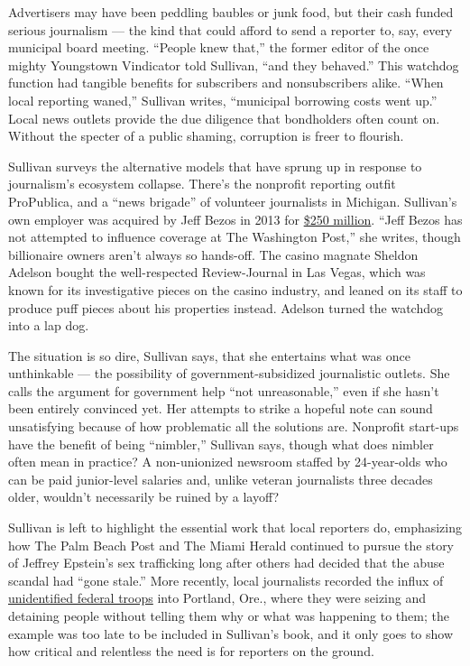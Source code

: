 Advertisers may have been peddling baubles or junk food, but their cash
funded serious journalism --- the kind that could afford to send a
reporter to, say, every municipal board meeting. ``People knew that,''
the former editor of the once mighty Youngstown Vindicator told
Sullivan, ``and they behaved.'' This watchdog function had tangible
benefits for subscribers and nonsubscribers alike. ``When local
reporting waned,'' Sullivan writes, ``municipal borrowing costs went
up.'' Local news outlets provide the due diligence that bondholders
often count on. Without the specter of a public shaming, corruption is
freer to flourish.

Sullivan surveys the alternative models that have sprung up in response
to journalism's ecosystem collapse. There's the nonprofit reporting
outfit ProPublica, and a ``news brigade'' of volunteer journalists in
Michigan. Sullivan's own employer was acquired by Jeff Bezos in 2013 for
\href{https://www.nytimes3xbfgragh.onion/2019/02/11/business/media/washington-post-jeff-bezos.html}{\$250
million}. ``Jeff Bezos has not attempted to influence coverage at The
Washington Post,'' she writes, though billionaire owners aren't always
so hands-off. The casino magnate Sheldon Adelson bought the
well-respected Review-Journal in Las Vegas, which was known for its
investigative pieces on the casino industry, and leaned on its staff to
produce puff pieces about his properties instead. Adelson turned the
watchdog into a lap dog.

The situation is so dire, Sullivan says, that she entertains what was
once unthinkable --- the possibility of government-subsidized
journalistic outlets. She calls the argument for government help ``not
unreasonable,'' even if she hasn't been entirely convinced yet. Her
attempts to strike a hopeful note can sound unsatisfying because of how
problematic all the solutions are. Nonprofit start-ups have the benefit
of being ``nimbler,'' Sullivan says, though what does nimbler often mean
in practice? A non-unionized newsroom staffed by 24-year-olds who can be
paid junior-level salaries and, unlike veteran journalists three decades
older, wouldn't necessarily be ruined by a layoff?

Sullivan is left to highlight the essential work that local reporters
do, emphasizing how The Palm Beach Post and The Miami Herald continued
to pursue the story of Jeffrey Epstein's sex trafficking long after
others had decided that the abuse scandal had ``gone stale.'' More
recently, local journalists recorded the influx of
\href{https://www.opb.org/news/article/federal-law-enforcement-unmarked-vehicles-portland-protesters/}{unidentified
federal troops} into Portland, Ore., where they were seizing and
detaining people without telling them why or what was happening to them;
the example was too late to be included in Sullivan's book, and it only
goes to show how critical and relentless the need is for reporters on
the ground.

